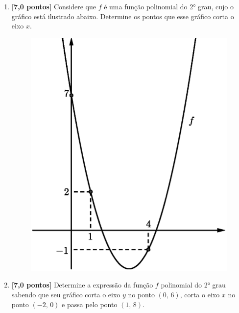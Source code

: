 \documentclass[12pt,a4paper]{article}
\begin{document}
\begin{enumerate}
  \item \textbf{[7,0 pontos]} Considere que $f$ é uma função polinomial do 2° grau, cujo o gráfico está
  ilustrado abaixo. Determine os pontos que esse gráfico corta o eixo $x$.

  \begin{figure}[H]
   \centering
   \includegraphics[scale=0.625]{figura/grafico-funcao-polinomio-segundo-grau.eps}
  \end{figure}
  
  \item \textbf{[7,0 pontos]} Determine a expressão da função $f$ polinomial do 2° grau sabendo que seu gráfico 
  corta o eixo $y$ no ponto $(0,\, 6)$, corta o eixo $x$ no ponto $(-2,\, 0)$ e passa
  pelo ponto $(1,\, 8)$.

\end{enumerate}
\end{document}
